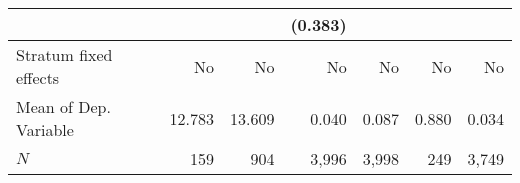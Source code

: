 \begin{tabular}{lrrrrrr}
                                  &          &                          &                                              (0.383) &                                               &                                                     &                                                     \\ 
\midrule
Stratum fixed effects             &       No &                       No &                                                   No &                                            No &                                                  No &                                                  No \\ 
Mean of Dep. Variable             &   12.783 &                   13.609 &                                                0.040 &                                         0.087 &                                               0.880 &                                               0.034 \\ 
$N$                               &      159 &                      904 &                                                3,996 &                                         3,998 &                                                 249 &                                               3,749 \\ 
\bottomrule
\end{tabular}
